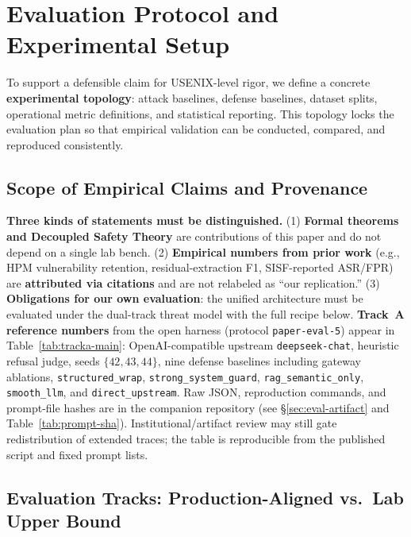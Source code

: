 \documentclass[letterpaper,twocolumn,10pt]{article}
\begin{document}
\section{Evaluation Protocol and Experimental Setup}
\label{sec:evaluation}

To support a defensible claim for USENIX-level rigor, we define a concrete \textbf{experimental topology}: attack baselines, defense baselines, dataset splits, operational metric definitions, and statistical reporting. This topology locks the evaluation plan so that empirical validation can be conducted, compared, and reproduced consistently.

\subsection{Scope of Empirical Claims and Provenance}
\label{sec:eval-scope}

\textbf{Three kinds of statements must be distinguished.} (1) \textbf{Formal theorems and Decoupled Safety Theory} are contributions of this paper and do not depend on a single lab bench. (2) \textbf{Empirical numbers from prior work} (e.g., HPM vulnerability retention, residual-extraction F1, SISF-reported ASR/FPR) are \textbf{attributed via citations} and are not relabeled as ``our replication.'' (3) \textbf{Obligations for our own evaluation}: the unified architecture must be evaluated under the dual-track threat model with the full recipe below. \textbf{Track~A reference numbers} from the open harness (protocol \texttt{paper-eval-5}) appear in Table~\ref{tab:tracka-main}: OpenAI-compatible upstream \texttt{deepseek-chat}, heuristic refusal judge, seeds $\{42,43,44\}$, nine defense baselines including gateway ablations, \texttt{structured\_wrap}, \texttt{strong\_system\_guard}, \texttt{rag\_semantic\_only}, \texttt{smooth\_llm}, and \texttt{direct\_upstream}. Raw JSON, reproduction commands, and prompt-file hashes are in the companion repository (see \S\ref{sec:eval-artifact} and Table~\ref{tab:prompt-sha}). Institutional/artifact review may still gate redistribution of extended traces; the table is reproducible from the published script and fixed prompt lists.

\subsection{Evaluation Tracks: Production-Aligned vs.\ Lab Upper Bound}
\label{sec:eval-tracks}
\end{document}
